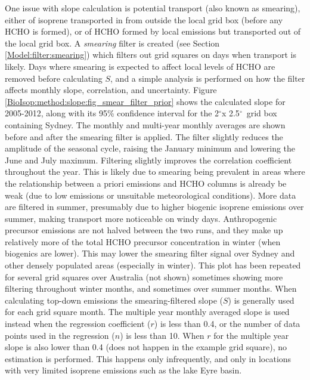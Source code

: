 \documentclass[acp, manuscript]{copernicus}
\newcommand{\degr}{$^{\circ}$}
\begin{document}
    One issue with slope calculation is potential transport (also known as smearing), either of isoprene transported in from outside the local grid box (before any HCHO is formed), or of HCHO formed by local emissions but transported out of the local grid box.
    A \textit{smearing} filter is created (see Section \ref{Model:filter:smearing}) which filters out grid squares on days when transport is likely.
    Days where smearing is expected to affect local levels of HCHO are removed before calculating $S$, and a simple analysis is performed on how the filter affects monthly slope, correlation, and uncertainty.
    Figure \ref{BioIsop:method:slope:fig_smear_filter_prior} shows the calculated slope for 2005-2012, along with its 95\% confidence interval for the 2\degr x 2.5\degr ~grid box containing Sydney.
    The monthly and multi-year monthly averages are shown before and after the smearing filter is applied.
    The filter slightly reduces the amplitude of the seasonal cycle, raising the January minimum and lowering the June and July maximum.
    Filtering slightly improves the correlation coefficient throughout the year.
    This is likely due to smearing being prevalent in areas where the relationship between a priori emissions and HCHO columns is already be weak (due to low emissions or unsuitable meteorological conditions).
    More data are filtered in summer, presumably due to higher biogenic isoprene emissions over summer, making transport more noticeable on windy days.
    Anthropogenic precursor emissions are not halved between the two runs, and they make up relatively more of the total HCHO precursor concentration in winter (when biogenics are lower).
    This may lower the smearing filter signal over Sydney and other densely populated areas (especially in winter).
    This plot has been repeated for several grid squares over Australia (not shown) sometimes showing more filtering throughout winter months, and sometimes over summer months.
    When calculating top-down emissions the smearing-filtered slope ($S$) is generally used for each grid square month.
    The multiple year monthly averaged slope is used instead when the regression coefficient ($r$) is less than 0.4, or the number of data points used in the regression ($n$) is less than 10.
    When $r$ for the multiple year slope is also lower than 0.4 (does not happen in the example grid square), no estimation is performed.%
    This happens only infrequently, and only in locations with very limited isoprene emissions such as the lake Eyre basin.
    
\end{document}
